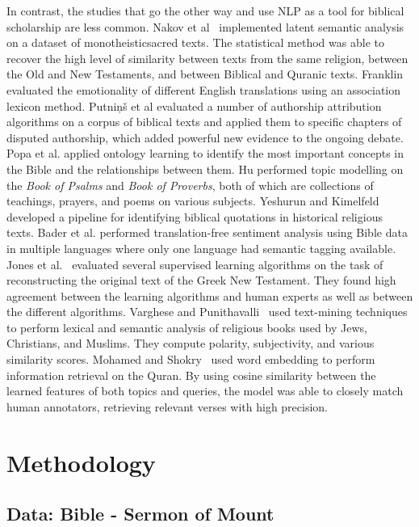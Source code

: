 \documentclass[5p,times]{elsarticle}
\begin{document}
In contrast, the studies that go the other way and use NLP as a tool for biblical scholarship are less common. Nakov et al~\cite{nakov2000latent} implemented latent semantic analysis on a dataset of  monotheisticsacred texts. The statistical method was able to recover the high level of similarity between texts from the same religion, between the Old and New Testaments, and between Biblical and Quranic texts.
Franklin \cite{franklin2018differences} evaluated the emotionality of different English translations using an association lexicon method.
Putniņš et al \cite{putnicnvs2006advanced} evaluated a number of authorship attribution algorithms on a corpus of biblical texts and applied them to specific chapters of disputed authorship, which added powerful new evidence to the ongoing debate.
Popa et al. \cite{popa2019extracting} applied ontology learning to identify the most important concepts in the Bible and the relationships between them.
Hu \cite{hu2012unsupervised} performed topic modelling on the \textit{Book of Psalms} and \textit{Book of Proverbs}, both of which are collections of teachings, prayers, and poems on various subjects.
Yeshurun and Kimelfeld \cite{yeshurun2021extracting} developed a pipeline for identifying biblical quotations in historical religious texts.
Bader et al. \cite{bader2011multilingual} performed translation-free sentiment analysis using Bible data in multiple languages where only one language had semantic tagging available.
Jones et al.~\cite{jones2022machine} evaluated several supervised learning algorithms on the task of reconstructing the original text of the Greek New Testament. They found high agreement between the learning algorithms and human experts as well as between the different algorithms.
Varghese and Punithavalli~\cite{varghese2019lexical} used text-mining techniques to perform lexical and semantic analysis of religious books used by Jews, Christians, and Muslims. They compute polarity, subjectivity, and various similarity scores.
Mohamed and Shokry~\cite{mohamed2022QSST} used word embedding to perform information retrieval on the Quran. By using cosine similarity between the learned features of both topics and queries, the model was able to closely match human annotators, retrieving relevant verses with high precision.
  
 
\section{Methodology}

\subsection{Data: Bible - Sermon of Mount}
\end{document}
